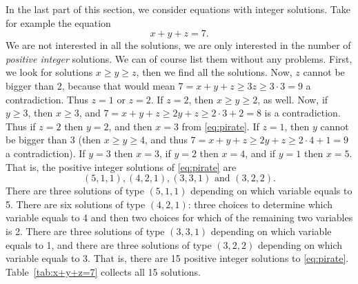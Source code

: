 In the last part of this section, 
we consider equations with integer solutions. 
Take for example the equation 
\begin{equation}\label{eq:pirate}
x+y+z = 7.
\end{equation}
We are not interested in all the solutions, 
we are only interested in the number of \emph{positive integer} solutions. 
We can of course list them without any problems. 
First, we look for solutions $x \geq y \geq z$, 
then we find all the solutions. 
Now, $z$ cannot be bigger than 2, 
because that would mean $7 = x+ y + z \geq 3z \geq 3\cdot 3 = 9$ a contradiction. 
Thus $z=1$ or $z=2$. 
If $z = 2$, then $x\geq y \geq 2$, as well. 
Now, if $y \geq 3$, then $x \geq 3$, 
and $7 = x + y + z \geq 2y + z \geq 2\cdot 3 + 2 = 8$ is a contradiction. 
Thus if $z=2$ then $y=2$, and then $x= 3$ from \eqref{eq:pirate}. 
If $z=1$, then $y$ cannot be bigger than 3 
(then $x\geq y \geq 4$, and thus $7 = x+y+z \geq 2y + z \geq 2 \cdot 4 + 1 = 9$ a contradiction). 
If $y = 3$ then $x=3$, 
if $y = 2$ then $x=4$, 
and if $y = 1$ then $x=5$.  
That is, the positive integer solutions of \eqref{eq:pirate} are $$(5, 1, 1), (4, 2, 1), 
(3, 3, 1) \mbox{ and } (3, 2, 2).$$ 
There are three solutions of type $(5, 1, 1)$ depending on which variable equals to 5. 
There are six solutions of type $(4, 2, 1)$: 
three choices to determine which variable equals to 4 and then two choices for which of the remaining two variables is 2. 
There are three solutions of type $(3, 3, 1)$ depending on which variable equals to 1, 
and there are three solutions of type $(3, 2, 2)$ depending on which variable equals to 3. 
That is, there are 15 positive integer solutions to \eqref{eq:pirate}. 
Table~\ref{tab:x+y+z=7} collects all 15 solutions. 

